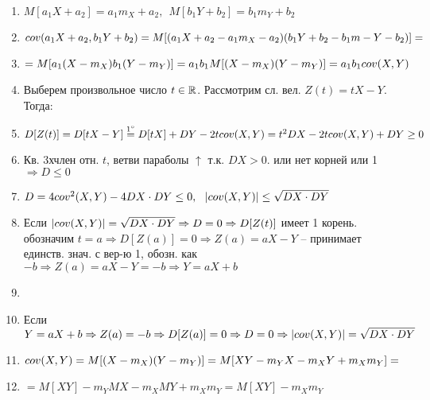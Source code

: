 \begin{enumerate}[topsep=0pt, leftmargin=20pt, noitemsep, label=\arabic*\degree]
	\item $M[a_1X+a_2]=a_1m_X+a_2,~~M[b_1Y+b_2]=b_1m_Y+b_2$
	\item [] $cov(a_1X+a_2, b_1Y+b_2)=M[(a_1X+a_2-a_1m_X-a_2)(b_1Y+b_2-b_1m-Y-b_2)]=$
	\item [] $=M[a_1(X-m_X)b_1(Y-m_Y)]=a_1b_1M[(X-m_X)(Y-m_Y)]=a_1b_1cov(X,Y)$
	
	\item Выберем произвольное число
$t\in\mathbb{R}$. Рассмотрим сл. вел. $Z(t)=tX-Y$. Тогда:
	\item [] $D[Z(t)]=D[tX-Y]\stackrel{1\degree}{=}D[tX]+DY-2tcov(X,Y)=t^2DX-2tcov(X,Y) +DY\geq 0$
	\item [] Кв. 3хчлен отн. $t$, ветви параболы $\uparrow$ т.к. $DX>0$. или нет корней или 1 $\Rightarrow D\leq 0$
	\item [] $D=4cov^2(X,Y)-4DX\cdot DY\leq 0,~~|cov(X,Y)|\leq \sqrt{DX\cdot DY}$
	\item [] \NEOB Если $|cov(X,Y)|=\sqrt{DX\cdot DY}\Rightarrow D=0\Rightarrow D[Z(t)]$ имеет 1 корень. обозначим $t=a\Rightarrow D[Z(a)]=0\Rightarrow Z(a)=aX-Y$ -- принимает единств. знач. с вер-ю 1, обозн. как $-b\Rightarrow Z(a)=aX-Y=-b\Rightarrow Y=aX+b$
	\item [] \DOST 
	\item [] Если $Y=aX+b\Rightarrow Z(a)=-b\Rightarrow D[Z(a)]=0\Rightarrow D=0\Rightarrow |cov(X,Y)|=\sqrt{DX\cdot DY}$
	
	\item $cov(X,Y)=M[(X-m_X)(Y-m_Y)]=M[XY-m_YX-m_XY+m_Xm_Y]=$
	\item [] $=M[XY]-m_YMX-m_XMY+m_Xm_Y=M[XY]-m_Xm_Y$
\end{enumerate}

\clearpage
